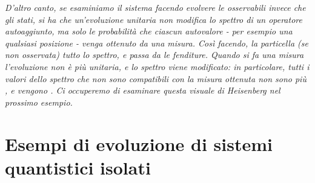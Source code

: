 \documentclass[../../FisicaTeorica.tex]{subfiles}
\begin{document}
\textit{D'altro canto, se esaminiamo il sistema facendo evolvere le osservabili invece che gli stati, si ha che un'evoluzione unitaria non modifica lo spettro di un operatore autoaggiunto, ma solo le probabilità che ciascun autovalore - per esempio una qualsiasi posizione - venga ottenuto da una misura. Così facendo, la particella (se non osservata)  tutto lo spettro, e passa da  le fenditure. Quando si fa una misura l'evoluzione non è più unitaria, e lo spettro viene modificato: in particolare, tutti i valori dello spettro che non sono compatibili con la misura ottenuta non sono più , e vengono . Ci occuperemo di esaminare questa visuale di Heisenberg nel prossimo esempio.}

\section{Esempi di evoluzione di sistemi quantistici isolati}
\end{document}
